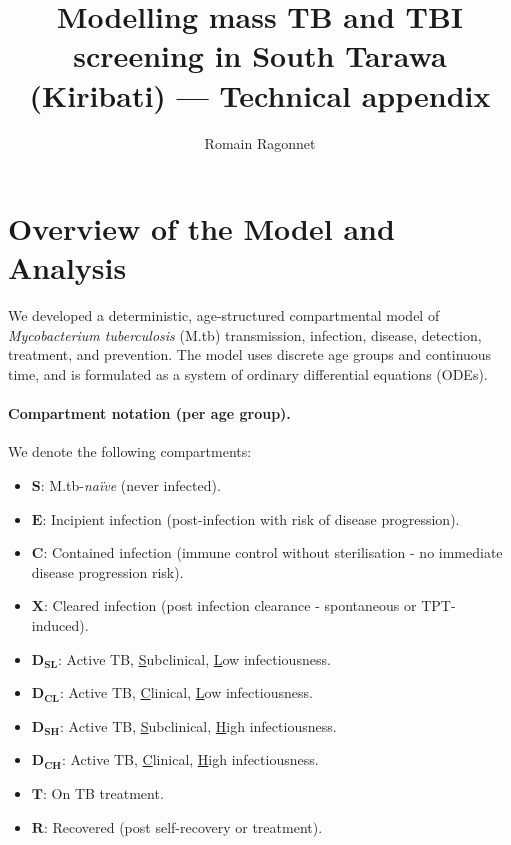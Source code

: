 \documentclass[11pt]{article}
\title{Modelling mass TB and TBI screening in South Tarawa (Kiribati) --- Technical appendix}
\date{}
\author{Romain Ragonnet}
\begin{document}
 
\maketitle

\tableofcontents
\clearpage

\section{Overview of the Model and Analysis}

We developed a deterministic, age-structured compartmental model of \textit{Mycobacterium tuberculosis} (M.tb) transmission, infection, disease, detection, treatment, and prevention. The model uses discrete age groups and continuous time, and is formulated as a system of ordinary differential equations (ODEs).

\paragraph{Compartment notation (per age group).}
We denote the following compartments:
\begin{itemize}
    \item \(\mathbf{S}\): M.tb-\emph{na\"ive} (never infected).
    \item \(\mathbf{E}\): Incipient infection (post-infection with risk of disease progression).
    \item \(\mathbf{C}\): Contained infection (immune control without sterilisation - no immediate disease progression risk).
    \item \(\mathbf{X}\): Cleared infection (post infection clearance - spontaneous or TPT-induced).
    \item \(\mathbf{D_{SL}}\): Active TB, \underline{S}ubclinical, \underline{L}ow infectiousness.
    \item \(\mathbf{D_{CL}}\): Active TB, \underline{C}linical, \underline{L}ow infectiousness.
    \item \(\mathbf{D_{SH}}\): Active TB, \underline{S}ubclinical, \underline{H}igh infectiousness.
    \item \(\mathbf{D_{CH}}\): Active TB, \underline{C}linical, \underline{H}igh infectiousness.
    \item \(\mathbf{T}\): On TB treatment.
    \item \(\mathbf{R}\): Recovered (post self-recovery or treatment).
\end{itemize}
\end{document}
